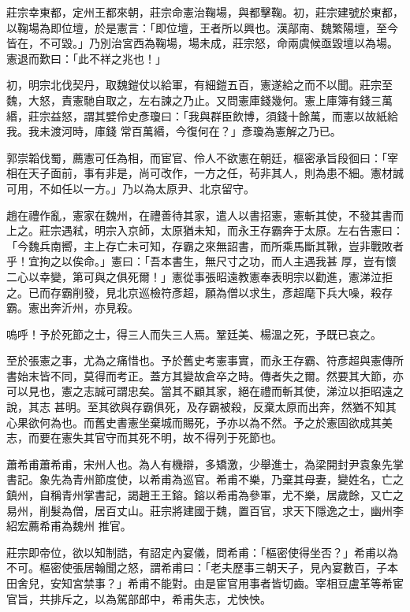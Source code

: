 \begin{pinyinscope}
 莊宗幸東都，定州王都來朝，莊宗命憲治鞠場，與都擊鞠。初，莊宗建號於東都，以鞠場為即位壇，於是憲言：「即位壇，王者所以興也。漢鄗南、魏繁陽壇，至今皆在，不可毀。」乃別治宮西為鞠場，場未成，莊宗怒，命兩虞候亟毀壇以為場。憲退而歎曰：「此不祥之兆也！」



 初，明宗北伐契丹，取魏鎧仗以給軍，有細鎧五百，憲遂給之而不以聞。莊宗至魏，大怒，責憲馳自取之，左右諫之乃止。又問憲庫錢幾何。憲上庫簿有錢三萬緡，莊宗益怒，謂其嬖伶史彥瓊曰：「我與群臣飲博，須錢十餘萬，而憲以故紙給我。我未渡河時，庫錢
 常百萬緡，今復何在？」彥瓊為憲解之乃已。



 郭崇韜伐蜀，薦憲可任為相，而宦官、伶人不欲憲在朝廷，樞密承旨段徊曰：「宰相在天子面前，事有非是，尚可改作，一方之任，茍非其人，則為患不細。憲材誠可用，不如任以一方。」乃以為太原尹、北京留守。



 趙在禮作亂，憲家在魏州，在禮善待其家，遣人以書招憲，憲斬其使，不發其書而上之。莊宗遇弒，明宗入京師，太原猶未知，而永王存霸奔于太原。左右告憲曰：「今魏兵南嚮，主上存亡未可知，存霸之來無詔書，而所乘馬斷其鞦，豈非戰敗者乎！宜拘之以俟命。」憲曰：「吾本書生，無尺寸之功，而人主遇我甚
 厚，豈有懷二心以幸變，第可與之俱死爾！」憲從事張昭遠教憲奉表明宗以勸進，憲涕泣拒之。已而存霸削發，見北京巡檢符彥超，願為僧以求生，彥超麾下兵大噪，殺存霸。憲出奔沂州，亦見殺。



 嗚呼！予於死節之士，得三人而失三人焉。鞏廷美、楊溫之死，予既已哀之。



 至於張憲之事，尤為之痛惜也。予於舊史考憲事實，而永王存霸、符彥超與憲傳所書始末皆不同，莫得而考正。蓋方其變故倉卒之時。傳者失之爾。然要其大節，亦可以見也，憲之志誠可謂忠矣。當其不顧其家，絕在禮而斬其使，涕泣以拒昭遠之說，其志
 甚明。至其欲與存霸俱死，及存霸被殺，反棄太原而出奔，然猶不知其心果欲何為也。而舊史書憲坐棄城而賜死，予亦以為不然。予之於憲固欲成其美志，而要在憲失其官守而其死不明，故不得列于死節也。



 蕭希甫蕭希甫，宋州人也。為人有機辯，多矯激，少舉進士，為梁開封尹袁象先掌書記。象先為青州節度使，以希甫為巡官。希甫不樂，乃棄其母妻，變姓名，亡之鎮州，自稱青州掌書記，謁趙王王鎔。鎔以希甫為參軍，尤不樂，居歲餘，又亡之易州，削髮為僧，居百丈山。莊宗將建國于魏，置百官，求天下隱逸之士，幽州李紹宏薦希甫為魏州
 推官。



 莊宗即帝位，欲以知制誥，有詔定內宴儀，問希甫：「樞密使得坐否？」希甫以為不可。樞密使張居翰聞之怒，謂希甫曰：「老夫歷事三朝天子，見內宴數百，子本田舍兒，安知宮禁事？」希甫不能對。由是宦官用事者皆切齒。宰相豆盧革等希宦官旨，共排斥之，以為駕部郎中，希甫失志，尤怏怏。




\end{pinyinscope}
